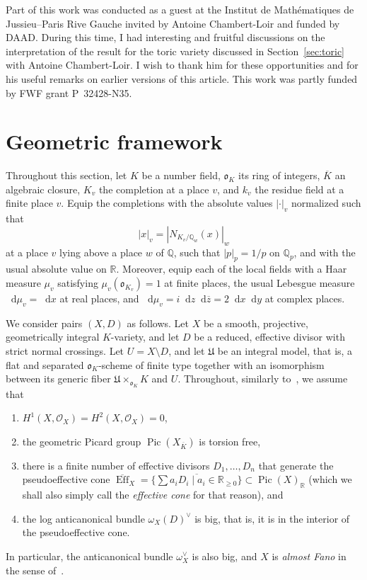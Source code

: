 \documentclass[a4paper, twoside, 10pt]{amsart}
\newcommand*\diff{\mathop{}\!\mathrm{d}}
\newcommand{\cO}{\mathcal{O}}
\newcommand{\mU}{\mathfrak{U}}
\newcommand{\fo}{\mathfrak{o}}
\newcommand{\RR}{\mathbb{R}}
\newcommand{\Kbar}{{\overline{K}}}
\newcommand{\QQ}{\mathbb{Q}}
\DeclareMathOperator{\Eff}{Eff}
\DeclareMathOperator{\Pic}{Pic}
\newcommand{\abs}[1]{\left\lvert#1\right\rvert}
\theoremstyle{definition}
\begin{document}
Part of this work was conducted as a guest at the
Institut de Mathématiques de Jussieu--Paris Rive Gauche invited by
Antoine Chambert-Loir and funded by DAAD\@.
During this time, I had interesting and fruitful discussions on
the interpretation of the result for the toric variety discussed
in Section~\ref{sec:toric} with Antoine Chambert-Loir.
I wish to thank him for these opportunities and for his useful remarks on
earlier versions of this article. This work was partly funded by
FWF grant P~32428-N35.  



\section{Geometric framework}\label{sec:expectations}

Throughout this section, let $K$ be a number field, $\fo_K$ its ring of integers, $\Kbar$ an algebraic closure, $K_v$ the completion at a place $v$, and $k_v$ the residue field at a finite place $v$.
Equip the completions with the absolute values $\abs{\cdot}_v$
normalized such that
\[
  \abs{x}_v=\abs{N_{K_v/\QQ_w}(x)}_w
\]
at a place $v$ lying above a place $w$ of $\QQ$, such that $\abs{p}_p=1/p$ on $\QQ_p$, and with the usual absolute value on $\RR$. Moreover, equip each of the local fields with a Haar measure $\mu_v$ satisfying $\mu_v(\fo_{K_v})=1$ at finite places,
the usual Lebesgue measure $\diff\mu_v=\diff x$ at real places,
and $\diff\mu_v=i \diff z \diff \overline{z} = 2 \diff x \diff y$ at complex places.

We consider pairs $(X,D)$ as follows. Let $X$ be a smooth, projective, geometrically integral $K$-variety, and let $D$ be a reduced, effective divisor with strict normal crossings. Let $U=X\setminus D$, and let $\mU$ be an integral model, that is, a flat and separated $\fo_K$-scheme of finite type together with an isomorphism between its generic fiber $\mU \times_{\fo_K} K$ and $U$.
Throughout, similarly to~\cite[Déf~3.1, Hyp.~3.3]{MR2019019}, we assume that
\begin{enumerate}[label = (\arabic*)]
  \item $H^1(X,\cO_X)=H^2(X,\cO_X)=0$,
  \item the geometric Picard group $\Pic(X_\Kbar)$ is torsion free,
  \item there is a finite number of effective divisors $D_1,\dots, D_n$ that generate the pseudoeffective cone
  $\overline{\Eff}_X=\overline{\{\sum a_i D_i \mid a_i \in\RR_{\ge 0}\}} \subset {\Pic(X)}_\RR$ (which we shall also simply call the \emph{effective cone} for that reason), and
  \item the log anticanonical bundle ${\omega_X(D)}^\vee$ is big, that is, it is in the interior of the pseudoeffective cone.
\end{enumerate}
In particular, the anticanonical bundle $\omega_X^\vee$ is also big, and $X$ is \emph{almost Fano} in the sense of~\cite[Déf~3.1]{MR2019019}.
\end{document}
